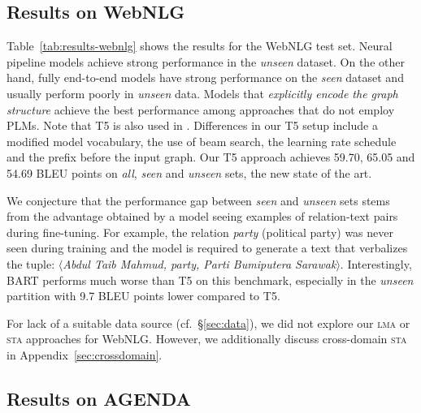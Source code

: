 \documentclass[11pt]{article}
\begin{document}
\subsection{Results on WebNLG}



Table~\ref{tab:results-webnlg} shows the results for the WebNLG test set. Neural pipeline models \cite{moryossef-etal-2019-step, castro-ferreira-etal-2019-neural} achieve strong performance in the \emph{unseen} dataset. On the other hand, fully end-to-end models \cite{ribeiro-etal-2020-modeling,schmitt2020modeling} have strong performance on the \emph{seen} dataset and usually perform poorly in \textit{unseen} data. Models that \emph{explicitly encode the graph structure} \cite{ribeiro-etal-2020-modeling, zhao-etal-2020-bridging} achieve the best performance among approaches that do not employ PLMs. Note that T5 is also used in \citet{kale2020texttotext}. Differences in our T5 setup include a modified model vocabulary, the use of beam search, the learning rate schedule and the prefix before the input graph. Our T5 approach achieves 59.70, 65.05 and 54.69 BLEU points on \emph{all}, \emph{seen} and \emph{unseen} sets, the new state of the art. 

We conjecture that the performance gap between \emph{seen} and \emph{unseen} sets stems from the advantage obtained by a model seeing examples of relation-text pairs during fine-tuning. For example, the relation \emph{party} (political party) was never seen during training and the model is required to generate a text that verbalizes the tuple: $\langle$\emph{Abdul Taib Mahmud, party, Parti Bumiputera Sarawak}$\rangle$. Interestingly, BART performs much worse than T5 on this benchmark, especially in the \emph{unseen} partition with 9.7 BLEU points lower compared to T5.

For lack of a suitable data source (cf.\ \S\ref{sec:data}), we did not explore our \textsc{lma} or \textsc{sta} approaches for WebNLG.
However, we additionally discuss cross-domain \textsc{sta} in Appendix~\ref{sec:crossdomain}.









\subsection{Results on AGENDA}
\end{document}

